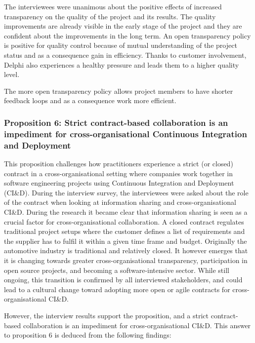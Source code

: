  The interviewees were unanimous about the positive effects of increased transparency on the quality of the project and its results. The quality improvements are already visible in the early stage of the project and they are confident about the improvements in the long term. An open transparency policy is positive for quality control because of mutual understanding of the project status and as a consequence gain in efficiency. Thanks to customer involvement, Delphi also experiences a healthy pressure and leads them to a higher quality level.

 The more open transparency policy allows project members to have shorter feedback loops and as a consequence work more efficient.

\subsubsection{Proposition 6: Strict contract-based collaboration is an impediment for cross-organisational Continuous Integration and Deployment}

This proposition challenges how practitioners experience a strict (or closed) contract in a cross-organisational setting where companies work together in software engineering projects using Continuous Integration and Deployment (CI\&D). During the interview survey, the interviewees were asked about the role of the contract when looking at information sharing and cross-organisational CI\&D. During the research it became clear that information sharing is seen as a crucial factor for cross-organisational collaboration. A closed contract regulates traditional project setups where the customer defines a list of requirements and the supplier has to fulfil it within a given time frame and budget. Originally the automotive industry is traditional and relatively closed. It however emerges that it is changing towards greater cross-organisational transparency, participation in open source projects, and becoming a software-intensive sector. While still ongoing, this transition is confirmed by all interviewed stakeholders, and could lead to a cultural change toward adopting more open or agile contracts for cross-organisational CI\&D.

However, the interview results support the proposition, and a strict contract-based collaboration is an impediment for cross-organisational CI\&D. This answer to proposition 6 is deduced from the following findings:

